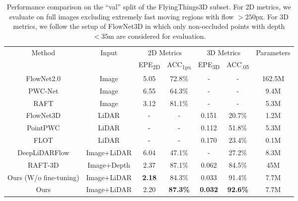 \documentclass[10pt,twocolumn,letterpaper]{article}
\begin{document}
\begin{table*}
    \centering
    \begin{tabular}{c|c|cc|cc|c}
    \hline
    \multirow{2}{*}{Method} & \multirow{2}{*}{Input} & \multicolumn{2}{c|}{2D Metrics} & \multicolumn{2}{c|}{3D Metrics} & \multirow{2}{*}{Parameters} \\
    & & EPE\textsubscript{2D} & ACC\textsubscript{1px} & EPE\textsubscript{3D} & ACC\textsubscript{.05} \\
    \hline
    FlowNet2.0 \cite{ilg2017flownet2} & Image & 5.05 & 72.8\% & - & - & 162.5M \\
    PWC-Net \cite{sun2018pwc}         & Image & 6.55 & 64.3\% & - & - & 9.4M \\
    RAFT \cite{teed2020raft}          & Image & 3.12 & 81.1\% & - & - & 5.3M \\
    \hline
    FlowNet3D \cite{liu2019flownet3d} & LiDAR & - & - & 0.151 & 20.7\% & 1.2M \\
    PointPWC \cite{wu2019pointpwc}    & LiDAR & - & - & 0.112 & 51.8\% & 5.3M \\
    FLOT \cite{puy2020flot}           & LiDAR & - & - & 0.170 & 23.4\% & 0.1M \\
    \hline
    DeepLiDARFlow \cite{rishav2020deeplidarflow} & Image+LiDAR & 6.04 & 47.1\% & - & 27.2\% & 8.3M \\
    RAFT-3D \cite{teed2021raft3d}                & Image+Depth & 2.37 & 87.1\% & 0.062 & 84.5\% & 45M \\
    \hline
    Ours (W/o fine-tuning) & Image+LiDAR & \textbf{2.18} & 84.3\% & 0.033 & 91.4\% & 7.7M \\
    Ours & Image+LiDAR & 2.20 & \textbf{87.3\%} & \textbf{0.032} & \textbf{92.6\%} & 7.7M \\
    \end{tabular}
    
    \vspace{-5pt}
    \caption{Performance comparison on the ``val'' split of the FlyingThings3D subset. For 2D metrics, we evaluate on full images excluding extremely fast moving regions with flow $>250$px. For 3D metrics, we follow the setup of FlowNet3D in which only non-occluded points with depth $<35$m are considered for evaluation.}
    \vspace{-10pt}
    \label{tab:main-things}
\end{table*}
\end{document}
